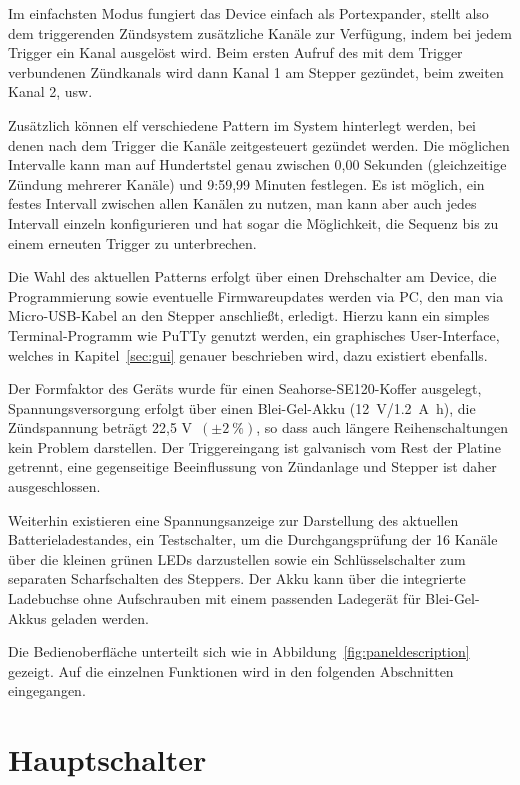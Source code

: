 \documentclass[paper=a4, open=any]{scrbook}
\begin{document}
		Im einfachsten Modus fungiert das Device einfach als Portexpander, stellt also dem triggerenden Zündsystem zusätzliche Kanäle zur Verfügung, indem bei jedem Trigger ein Kanal ausgelöst wird. Beim ersten Aufruf des mit dem Trigger verbundenen Zündkanals wird dann Kanal 1 am Stepper gezündet, beim zweiten Kanal 2, usw.

		Zusätzlich können elf verschiedene Pattern im System hinterlegt werden, bei denen nach dem Trigger die Kanäle zeitgesteuert gezündet werden. Die möglichen Intervalle kann man auf Hundertstel genau zwischen 0,00 Sekunden (gleichzeitige Zündung mehrerer Kanäle) und 9:59,99 Minuten festlegen. Es ist möglich, ein festes Intervall zwischen allen Kanälen zu nutzen, man kann aber auch jedes Intervall einzeln konfigurieren und hat sogar die Möglichkeit, die Sequenz bis zu einem erneuten Trigger zu unterbrechen.

		Die Wahl des aktuellen Patterns erfolgt über einen Drehschalter am Device, die Programmierung sowie eventuelle Firmwareupdates werden via PC, den man via Micro-USB-Kabel an den Stepper anschließt, erledigt. Hierzu kann ein simples Terminal-Programm wie PuTTy genutzt werden, ein graphisches User-Interface, welches in Kapitel~\ref{sec:gui} genauer beschrieben wird, dazu existiert ebenfalls.

		Der Formfaktor des Geräts wurde für einen Seahorse-SE120-Koffer ausgelegt, Spannungsversorgung erfolgt über einen Blei-Gel-Akku (\SI{12}{\volt}/\SI{1,2}{\ampere\hour}), die Zündspannung beträgt 22,5 V~$(\pm\SI{2}{\percent})$, so dass auch längere Reihenschaltungen kein Problem darstellen. Der Triggereingang ist galvanisch vom Rest der Platine getrennt, eine gegenseitige Beeinflussung von Zündanlage und Stepper ist daher ausgeschlossen.

		Weiterhin existieren eine Spannungsanzeige zur Darstellung des aktuellen Batterieladestandes, ein Testschalter, um die Durchgangsprüfung der 16 Kanäle über die kleinen grünen LEDs darzustellen sowie ein Schlüsselschalter zum separaten Scharfschalten des Steppers. Der Akku kann über die integrierte Ladebuchse ohne Aufschrauben mit einem passenden Ladegerät für Blei-Gel-Akkus geladen werden.

		Die Bedienoberfläche unterteilt sich wie in Abbildung~\ref{fig:paneldescription} gezeigt. Auf die einzelnen Funktionen wird in den folgenden Abschnitten eingegangen.

		\section{Hauptschalter}
\end{document}
